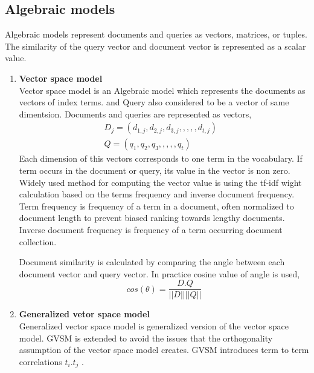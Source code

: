 

\subsection{Algebraic models}
Algebraic models represent documents and queries as vectors, matrices, or tuples. The similarity of the query vector and document vector is represented as a scalar value.

\begin{enumerate}
\item{\textbf{Vector space model}}\\
Vector space model is an Algebraic model which represents the documents as vectors of index terms. and Query also considered to be a vector of same dimentsion. Documents and queries are represented as vectors,
\begin{equation*}
\begin{split}
D_{j} = ( d_{1,j},d_{2,j},d_{3,j},,,,,d_{t,j}) & \\
Q = ( q_{1},q_{2},q_{3},,,,,q_{t} ) &
\end{split}
\end{equation*}
Each dimension of this vectors corresponds to one term in the vocabulary. If term occurs in the document or query, its value in the vector is non zero. Widely used method for computing the vector value is using the tf-idf wight calculation based on the terms frequency and inverse document frequency.  Term frequency is frequency of a term in a document, often normalized to document length to prevent biased ranking towards lengthy documents. Inverse document frequency is frequency of a term occurring document collection.

Document similarity is calculated by comparing the angle between each document vector and query vector. In practice cosine value of angle is used, 
\begin{equation}
cos(\theta) = \frac{D.Q}{||D||||Q||}
\end{equation}

\item{\textbf{Generalized vetor space model}}\\
Generalized vector space model is generalized version of the vector space model. GVSM is extended to avoid the issues that the orthogonality assumption of the vector space model creates. GVSM introduces term to term correlations $t_{i}.t_{j}$ .\\


\end{enumerate}
